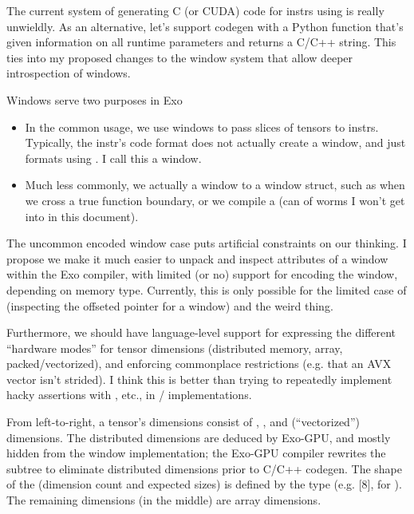 \filbreak
{}

The current system of generating C (or CUDA) code for instrs using  is really unwieldly.
As an alternative, let's support codegen with a Python function that's given information on all runtime parameters and returns a C/C++ string.
This ties into my proposed changes to the window system that allow deeper introspection of windows.

\newpage
{}

Windows serve two purposes in Exo
\begin{itemize}
 \item In the common usage, we use windows to pass slices of tensors to instrs.
 Typically, the instr's code format does not actually create a window, and just formats using .
 I call this a  window.
 \item Much less commonly, we actually  a window to a window struct, such as when we cross a true function boundary, or we compile a  (can of worms I won't get into in this document).
\end{itemize}
\filbreak
The uncommon encoded window case puts artificial constraints on our thinking.
I propose we make it much easier to unpack and inspect attributes of a window within the Exo compiler, with limited (or no) support for encoding the window, depending on memory type.
Currently, this is only possible for the limited case of  (inspecting the offseted pointer for a window) and the weird  thing.

\filbreak
Furthermore, we should have language-level support for expressing the different ``hardware modes'' for tensor dimensions (distributed memory, array, packed/vectorized), and enforcing commonplace restrictions (e.g. that an AVX vector isn't strided).
I think this is better than trying to repeatedly implement hacky assertions with , etc., in / implementations.

\filbreak
{}

From left-to-right, a tensor's dimensions consist of , , and  (``vectorized'') dimensions.
The distributed dimensions are deduced by Exo-GPU, and mostly hidden from the window implementation; the Exo-GPU compiler rewrites the subtree to eliminate distributed dimensions prior to C/C++ codegen.
The shape of the  (dimension count and expected sizes) is defined by the  type (e.g. [8], for ).
The remaining dimensions (in the middle) are array dimensions.

